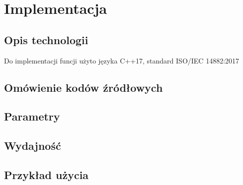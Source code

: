 \chapter{Implementacja}
\thispagestyle{chapterBeginStyle}


\section{Opis technologii}
Do implementacji funcji użyto języka C++17, standard ISO/IEC 14882:2017 \cite{cpp17pp17}


\section{Omówienie kodów źródłowych}


\section{Parametry}


\section{Wydajność}


\section{Przykład użycia}


